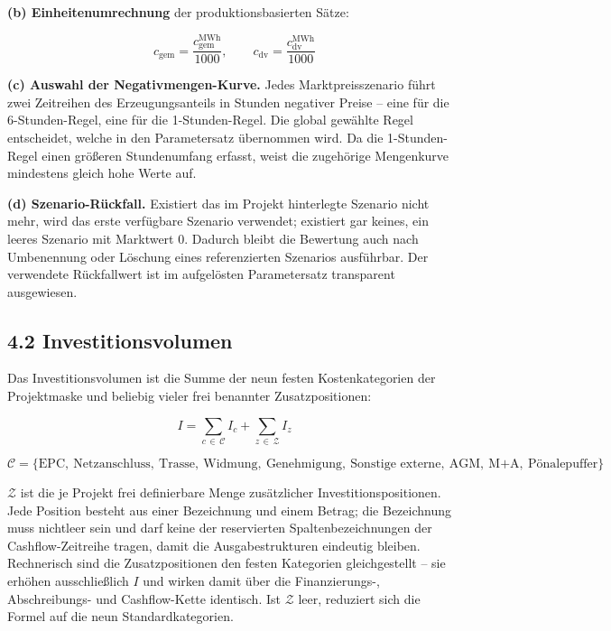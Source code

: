 \documentclass[
  a4paper,
  10pt]{article}
\begin{document}
\textbf{(b) Einheitenumrechnung} der produktionsbasierten Sätze:

\[ c_{\mathrm{gem}} = \frac{c^{\mathrm{MWh}}_{\mathrm{gem}}}{1000}, \qquad c_{\mathrm{dv}} = \frac{c^{\mathrm{MWh}}_{\mathrm{dv}}}{1000} \]

\textbf{(c) Auswahl der Negativmengen-Kurve.} Jedes Marktpreisszenario
führt zwei Zeitreihen des Erzeugungsanteils in Stunden negativer Preise
-- eine für die 6-Stunden-Regel, eine für die 1-Stunden-Regel. Die
global gewählte Regel entscheidet, welche in den Parametersatz
übernommen wird. Da die 1-Stunden-Regel einen größeren Stundenumfang
erfasst, weist die zugehörige Mengenkurve mindestens gleich hohe Werte
auf.

\textbf{(d) Szenario-Rückfall.} Existiert das im Projekt hinterlegte
Szenario nicht mehr, wird das erste verfügbare Szenario verwendet;
existiert gar keines, ein leeres Szenario mit Marktwert 0. Dadurch
bleibt die Bewertung auch nach Umbenennung oder Löschung eines
referenzierten Szenarios ausführbar. Der verwendete Rückfallwert ist im
aufgelösten Parametersatz transparent ausgewiesen.

\hypertarget{investitionsvolumen}{%
\subsection{4.2 Investitionsvolumen}\label{investitionsvolumen}}

Das Investitionsvolumen ist die Summe der neun festen Kostenkategorien
der Projektmaske und beliebig vieler frei benannter Zusatzpositionen:

\[ I = \sum_{c\, \in\, \mathcal{C}} I_c + \sum_{z\, \in\, \mathcal{Z}} I_z \]

\[ \mathcal{C} = \{\text{EPC},\ \text{Netzanschluss},\ \text{Trasse},\ \text{Widmung},\ \text{Genehmigung},\ \text{Sonstige externe},\ \text{AGM},\ \text{M+A},\ \text{Pönalepuffer}\} \]

\(\mathcal{Z}\) ist die je Projekt frei definierbare Menge zusätzlicher
Investitionspositionen. Jede Position besteht aus einer Bezeichnung und
einem Betrag; die Bezeichnung muss nichtleer sein und darf keine der
reservierten Spaltenbezeichnungen der Cashflow-Zeitreihe tragen, damit
die Ausgabestrukturen eindeutig bleiben. Rechnerisch sind die
Zusatzpositionen den festen Kategorien gleichgestellt -- sie erhöhen
ausschließlich \(I\) und wirken damit über die Finanzierungs-,
Abschreibungs- und Cashflow-Kette identisch. Ist \(\mathcal{Z}\) leer,
reduziert sich die Formel auf die neun Standardkategorien.
\end{document}
